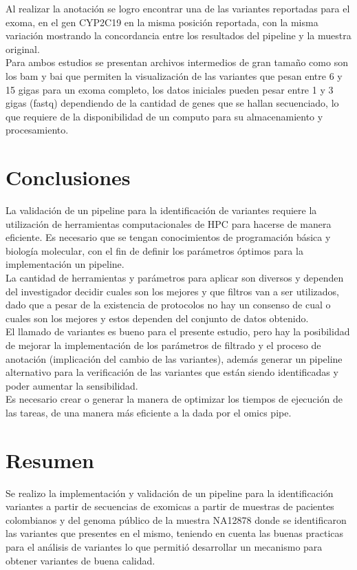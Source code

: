 Al realizar la anotación se logro encontrar una de las variantes reportadas para el exoma, en el gen CYP2C19 en la misma posición reportada, con la misma variación mostrando la concordancia entre los resultados del pipeline y la muestra original. \\

Para ambos estudios se presentan archivos intermedios de gran tamaño como son los bam y bai que permiten la visualización de las variantes que pesan entre 6 y 15 gigas para un exoma completo, los datos iniciales pueden pesar entre 1 y 3 gigas (fastq) dependiendo de la cantidad de genes que se hallan secuenciado, lo que requiere de la disponibilidad de un computo para su almacenamiento y procesamiento. 

\section{Conclusiones}

La validación de un pipeline para la identificación de variantes requiere la utilización de herramientas computacionales de HPC para hacerse de manera eficiente. Es necesario que se tengan conocimientos de programación básica y biología molecular, con el fin de definir los parámetros óptimos para la implementación un pipeline.\\ 

La cantidad de herramientas y parámetros para aplicar son diversos y dependen del investigador decidir cuales son los mejores y que filtros van a ser utilizados, dado que a pesar de la existencia de protocolos no hay un consenso de cual o cuales son los mejores y estos dependen del conjunto de datos obtenido. \\ 

El llamado de variantes es bueno para el presente estudio, pero hay la posibilidad de mejorar la implementación de los parámetros de filtrado y el proceso de anotación (implicación del cambio de las variantes), además generar un pipeline alternativo para la verificación de las variantes que están siendo identificadas y poder aumentar la sensibilidad. \\

Es necesario crear o generar la manera de optimizar los tiempos de ejecución de las tareas, de una manera más eficiente a la dada por el omics pipe.

\section*{Resumen}

Se realizo la implementación y validación de un pipeline para la identificación variantes a partir de secuencias de exomicas a partir de muestras de pacientes colombianos y del genoma público de la muestra NA12878 donde se identificaron las variantes que presentes en el mismo, teniendo en cuenta las buenas practicas para el análisis de variantes lo que permitió desarrollar un mecanismo para obtener variantes de buena calidad.
